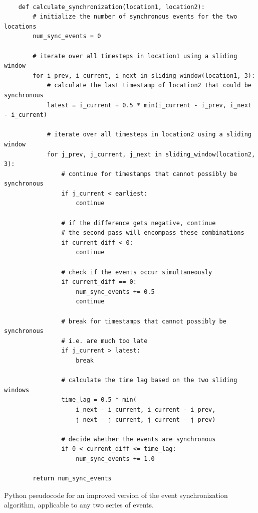 \begin{listing}[H]
  \begin{verbatim}

    def calculate_synchronization(location1, location2):
        # initialize the number of synchronous events for the two locations
        num_sync_events = 0

        # iterate over all timesteps in location1 using a sliding window
        for i_prev, i_current, i_next in sliding_window(location1, 3):
            # calculate the last timestamp of location2 that could be synchronous
            latest = i_current + 0.5 * min(i_current - i_prev, i_next - i_current)

            # iterate over all timesteps in location2 using a sliding window
            for j_prev, j_current, j_next in sliding_window(location2, 3):
                # continue for timestamps that cannot possibly be synchronous
                if j_current < earliest:
                    continue

                # if the difference gets negative, continue
                # the second pass will encompass these combinations
                if current_diff < 0:
                    continue

                # check if the events occur simultaneously
                if current_diff == 0:
                    num_sync_events += 0.5
                    continue

                # break for timestamps that cannot possibly be synchronous
                # i.e. are much too late
                if j_current > latest:
                    break

                # calculate the time lag based on the two sliding windows
                time_lag = 0.5 * min(
                    i_next - i_current, i_current - i_prev,
                    j_next - j_current, j_current - j_prev)

                # decide whether the events are synchronous
                if 0 < current_diff <= time_lag:
                    num_sync_events += 1.0

        return num_sync_events

  \end{verbatim}
  \caption{Python pseudocode for an improved version of the event synchronization algorithm, applicable to any two series of events.}
  \label{lst:event_synchronization_improved}
\end{listing}

